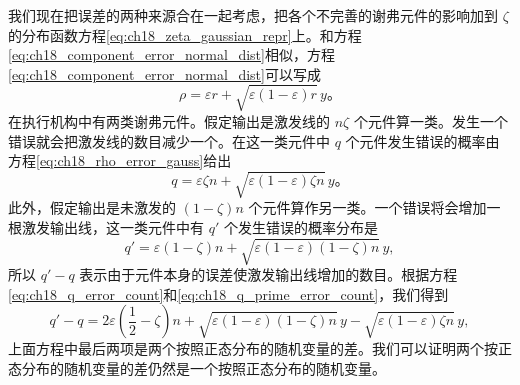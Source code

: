 我们现在把误差的两种来源合在一起考虑，把各个不完善的谢弗元件的影响加到 $\zeta$ 的分布函数方程\eqref{eq:ch18_zeta_gaussian_repr}上。和方程\eqref{eq:ch18_component_error_normal_dist}相似，方程\eqref{eq:ch18_component_error_normal_dist}可以写成
\begin{equation}
\rho = \varepsilon r + \sqrt{\varepsilon(1-\varepsilon)r}\,y。
\label{eq:ch18_rho_error_gauss}
\end{equation}
在执行机构中有两类谢弗元件。假定输出是激发线的 $n\zeta$ 个元件算一类。发生一个错误就会把激发线的数目减少一个。在这一类元件中 $q$ 个元件发生错误的概率由方程\eqref{eq:ch18_rho_error_gauss}给出
\begin{equation}
q = \varepsilon \zeta n + \sqrt{\varepsilon(1-\varepsilon)\zeta n}\,y。
\label{eq:ch18_q_error_count}
\end{equation}
此外，假定输出是未激发的 $(1-\zeta)n$ 个元件算作另一类。一个错误将会增加一根激发输出线，这一类元件中有 $q'$ 个发生错误的概率分布是
\begin{equation}
q' = \varepsilon(1-\zeta)n + \sqrt{\varepsilon(1-\varepsilon)(1-\zeta)n}\,y,
\label{eq:ch18_q_prime_error_count}
\end{equation}
所以 $q'-q$ 表示由于元件本身的误差使激发输出线增加的数目。根据方程\eqref{eq:ch18_q_error_count}和\eqref{eq:ch18_q_prime_error_count}，我们得到
\begin{equation}
q'-q = 2\varepsilon\left(\frac{1}{2}-\zeta\right)n + \sqrt{\varepsilon(1-\varepsilon)(1-\zeta)n}\,y - \sqrt{\varepsilon(1-\varepsilon)\zeta n}\,y,
\label{eq:ch18_delta_q_expression}
\end{equation}
上面方程中最后两项是两个按照正态分布的随机变量的差。我们可以证明两个按正态分布的随机变量的差仍然是一个按照正态分布的随机变量。

